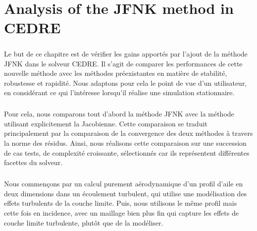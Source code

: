 \chapter{Analysis of the JFNK method in CEDRE}

\begin{tcolorbox}[title=Résumé du chapitre : Analyse de la méthode JFNK dans CEDRE, colframe=black!50!white]
  \paragraph{}
  Le but de ce chapitre est de vérifier les gains apportés par l'ajout de la méthode JFNK dans le solveur CEDRE.
  Il s'agit de comparer les performances de cette nouvelle méthode avec les méthodes préexistantes en matière de stabilité, robustesse et rapidité.
  Nous adaptons pour cela le point de vue d'un utilisateur, en considérant ce qui l'intéresse lorsqu'il réalise une simulation stationnaire.

  \paragraph{}
  Pour cela, nous comparons tout d'abord la méthode JFNK avec la méthode utilisant explicitement la Jacobienne.
  Cette comparaison se traduit principalement par la comparaison de la convergence des deux méthodes à travers la norme des résidus.
  Ainsi, nous réalisons cette comparaison sur une succession de cas tests, de complexité croissante, sélectionnés car ils représentent différentes facettes du solveur.

  \paragraph{}
  Nous commençons par un calcul purement aérodynamique d'un profil d'aile en deux dimensions dans un écoulement turbulent, qui utilise une modélisation des effets turbulents de la couche limite.
  Puis, nous utilisons le même profil mais cette fois en incidence, avec un maillage bien plus fin qui capture les effets de couche limite turbulente, plutôt que de la modéliser.


\end{tcolorbox}
